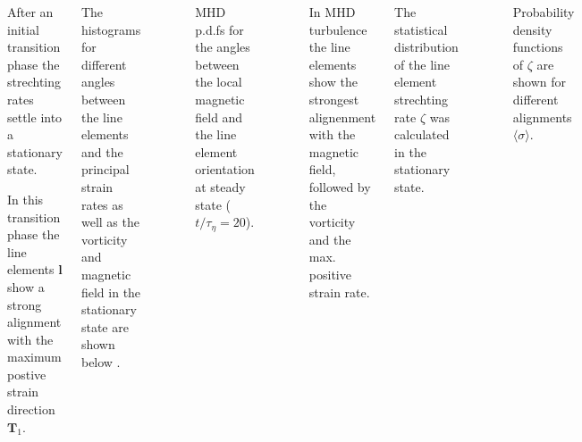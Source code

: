 \documentclass[20pt, a0paper, portrait, margin=15mm, innermargin=15mm,
     blockverticalspace=15mm, colspace=15mm, subcolspace=8mm]{tikzposter} %
\newcommand{\va}[1]{\bm{#1}}
\newcommand{\plot}[3]{
\begin{figure}[H]
    \centering
    \scriptsize
    \scalebox{1.3}{}
    \caption{\footnotesize{#2}}
    \label{#3}
\end{figure}
}
\begin{document}
\begin{columns}
{\begin{minipage}[t]{20cm}
                \begin{itemsposter}
                    \item After an initial transition phase the strechting rates
                        settle into a stationary state.

                    \vspace{0.5cm}

                    \item In this transition phase the line elements $\va{l}$ show
                        a strong alignment with the maximum postive strain direction
                        $\va{T}_1$.
                \end{itemsposter}


                The histograms for different angles between the line elements and the
                principal strain rates as well as the vorticity and magnetic field in the
                stationary state are shown below .

                \plot{figures/histograms/mhd_angle_histo_t20}
                    {MHD p.d.fs for the angles between the local magnetic field and the
                    line element orientation at steady state ($t/\tau_{\eta} = 20$).}
                    {mhd_strain_magnetic_angle_histo}

                \begin{itemsposter}
                    \item In MHD turbulence the line elements show the strongest
                        alignenment with the magnetic field, followed by the 
                        vorticity and the max. positive strain rate.
                \end{itemsposter}


            \end{minipage}
            \hfill
            \begin{minipage}[t]{20cm}

                    
                    The statistical distribution of the line element strechting
                    rate $\zeta$ was calculated in the stationary state. 

                    \plot{figures/histograms/mhd_zeta_histo_t20}
						{Probability density functions of $\zeta$ are shown for
                        different alignments $\langle \sigma \rangle$.}
						{histo}


\end{minipage}}
\end{columns}
\end{document}
